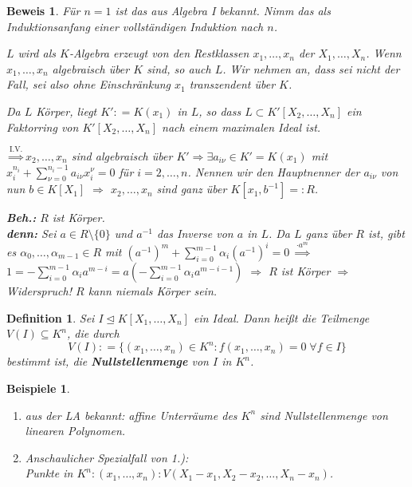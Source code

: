\documentclass[a4paper,12pt]{scrbook}
\theoremstyle{break}
\newtheorem{Def}{Definition}[chapter]
\theoremstyle{nonumberbreak}
\newtheorem{Bew}{Beweis}
\newtheorem{nnBsp}{Beispiele}
\theoremstyle{nonumberplain}
\newcommand{\emp}[1]{\textbf{\emph{#1}}}
\newcommand{\defeqr}[0]{\mathrel{\mathop:}=}
\newcommand{\defeql}[0]{=\mathrel{\mathop:}}
\begin{document}
\begin{Bew}
  Für $n=1$ ist das aus Algebra I bekannt. Nimm das als Induktionsanfang einer
  vollständigen Induktion nach $n$.

  $L$ wird als $K$-Algebra erzeugt von den Restklassen $x_1, \dots, x_n$ der
  $X_1, \dots, X_n$. Wenn $x_1, \dots, x_n$ algebraisch über $K$ sind, so auch
  $L$. Wir nehmen an, dass sei nicht der Fall, sei also ohne Einschränkung
  $x_1$ transzendent über $K$.

  Da $L$ Körper, liegt $K' \defeqr K(x_1)$ in $L$, so dass $L \subset K'[X_2,
  \dots, X_n]$ ein Faktorring von $K'[X_2, \dots, X_n]$ nach einem maximalen
  Ideal ist.

  $\overset{\text{I.V.}}{\Rightarrow} x_2, \dots, x_n$ sind algebraisch über $K'
  \Rightarrow \exists a_{i \nu} \in K'=K(x_1)$ mit $x_i^{n_i} + \sum_{\nu =
  0}^{n_i -1} a_{i \nu} x_i^{\nu} = 0$ für $i = 2, \dots, n$.
  Nennen wir den Hauptnenner der $a_{i \nu}$ von nun $b \in K[X_1]$ $\Rightarrow$
  $x_2, \dots, x_n$ sind ganz über $K[x_1, b^{-1}] \defeql R$.

  \textbf{Beh.:} $R$ ist Körper.\\
  \textbf{denn:} Sei $a \in R \setminus \{0\}$ und $a^{-1}$ das Inverse von $a$
  in $L$. Da $L$ ganz über $R$ ist, gibt es $\alpha_0, \dots, \alpha_{m-1} \in
  R$ mit $(a^{-1})^m + \sum_{i = 0}^{m-1} \alpha_i (a^{-1})^i = 0$ $\overset{
  \cdot a^m}{\Rightarrow}$ $1 = -\sum_{i=0}^{m-1} \alpha_i a^{m-i} = a
  (-\sum_{i=0}^{m-1} \alpha_i a^{m-i-1})$ $\Rightarrow$ $R$ ist Körper $\Rightarrow$
  Widerspruch! $R$ kann niemals Körper sein.
\end{Bew}

\begin{Def}
  Sei $I \trianglelefteq K[X_1, \dots, X_n]$ ein Ideal. Dann heißt die Teilmenge
  $V(I) \subseteq K^n$, die durch
  $$V(I) \defeqr \{(x_1, \dots, x_n) \in K^n: f(x_1, \dots, x_n) = 0 \; \forall f \in I\}$$
  bestimmt ist, die \emp{Nullstellenmenge} von $I$ in $K^n$.
\end{Def}

\begin{nnBsp} 
  \begin{enumerate}
    \item[1.)] aus der LA bekannt: affine Unterräume des $K^n$ sind
               Nullstellenmenge von linearen Polynomen.
    \item[2.)] Anschaulicher Spezialfall von 1.):\\
               Punkte in $K^n: (x_1, \dots, x_n): V(X_1-x_1, X_2 - x_2, \dots,
               X_n - x_n)$.
  \end{enumerate}
\end{nnBsp}
\end{document}
